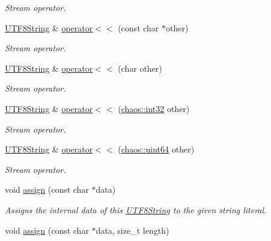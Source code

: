\begin{DoxyCompactItemize}
\begin{DoxyCompactList}\small\item\em Stream operator. \end{DoxyCompactList}\item 
\hyperlink{classchaos_1_1str_1_1_u_t_f8_string}{U\+T\+F8\+String} \& \hyperlink{classchaos_1_1str_1_1_u_t_f8_string_ac3ca865b7f68b13b4b5902793bbb750d}{operator$<$$<$} (const char $\ast$other)
\begin{DoxyCompactList}\small\item\em Stream operator. \end{DoxyCompactList}\item 
\hyperlink{classchaos_1_1str_1_1_u_t_f8_string}{U\+T\+F8\+String} \& \hyperlink{classchaos_1_1str_1_1_u_t_f8_string_a1fe072a86408b3eb0b3fdfe9f80e3b8d}{operator$<$$<$} (char other)
\begin{DoxyCompactList}\small\item\em Stream operator. \end{DoxyCompactList}\item 
\hyperlink{classchaos_1_1str_1_1_u_t_f8_string}{U\+T\+F8\+String} \& \hyperlink{classchaos_1_1str_1_1_u_t_f8_string_a1c174fd024e1535a2f485e290540a2a1}{operator$<$$<$} (\hyperlink{namespacechaos_ad1de7efb430365afd2c9446a0f522a90}{chaos\+::int32} other)
\begin{DoxyCompactList}\small\item\em Stream operator. \end{DoxyCompactList}\item 
\hyperlink{classchaos_1_1str_1_1_u_t_f8_string}{U\+T\+F8\+String} \& \hyperlink{classchaos_1_1str_1_1_u_t_f8_string_a0f069c833c4fad2e87f9e4fb1138eca6}{operator$<$$<$} (\hyperlink{namespacechaos_a34fe5f5bfc3ef6d80b5d094ed91b4d6e}{chaos\+::uint64} other)
\begin{DoxyCompactList}\small\item\em Stream operator. \end{DoxyCompactList}\item 
void \hyperlink{classchaos_1_1str_1_1_u_t_f8_string_a483e71ec1090e346c63bf2b13b37ad7a}{assign} (const char $\ast$data)
\begin{DoxyCompactList}\small\item\em Assigns the internal data of this \hyperlink{classchaos_1_1str_1_1_u_t_f8_string}{U\+T\+F8\+String} to the given string literal. \end{DoxyCompactList}\item 
void \hyperlink{classchaos_1_1str_1_1_u_t_f8_string_a631f935a5b85214a2fa662a78f5693aa}{assign} (const char $\ast$data, size\+\_\+t length)

\end{DoxyCompactItemize}
